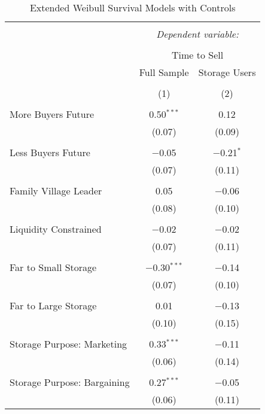 
\begin{table}[!htbp] \centering 
  \caption{Extended Weibull Survival Models with Controls} 
  \label{tab: extended Survival AFT with controls} 
\footnotesize 
\begin{tabular}{@{\extracolsep{5pt}}lcc} 
\\[-1.8ex]\hline 
\hline \\[-1.8ex] 
 & \multicolumn{2}{c}{\textit{Dependent variable:}} \\ 
\cline{2-3} 
\\[-1.8ex] & \multicolumn{2}{c}{Time to Sell} \\ 
 & Full Sample & Storage Users \\ 
\\[-1.8ex] & (1) & (2)\\ 
\hline \\[-1.8ex] 
 More Buyers Future & 0.50$^{***}$ & 0.12 \\ 
  & (0.07) & (0.09) \\ 
  & & \\ 
 Less Buyers Future & $-$0.05 & $-$0.21$^{*}$ \\ 
  & (0.07) & (0.11) \\ 
  & & \\ 
 Family Village Leader & 0.05 & $-$0.06 \\ 
  & (0.08) & (0.10) \\ 
  & & \\ 
 Liquidity Constrained & $-$0.02 & $-$0.02 \\ 
  & (0.07) & (0.11) \\ 
  & & \\ 
 Far to Small Storage & $-$0.30$^{***}$ & $-$0.14 \\ 
  & (0.07) & (0.10) \\ 
  & & \\ 
 Far to Large Storage & 0.01 & $-$0.13 \\ 
  & (0.10) & (0.15) \\ 
  & & \\ 
 Storage Purpose: Marketing & 0.33$^{***}$ & $-$0.11 \\ 
  & (0.06) & (0.14) \\ 
  & & \\ 
 Storage Purpose: Bargaining & 0.27$^{***}$ & $-$0.05 \\ 
  & (0.06) & (0.11) \\ 

\end{tabular}
\end{table}
